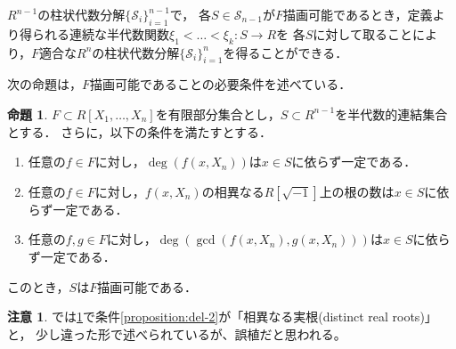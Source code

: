 \documentclass[uplatex, dvipdfmx]{jsarticle}
\numberwithin{equation}{section}
\newcommand{\map}[3]{{#1}\colon{#2}\rightarrow{#3}}
\theoremstyle{definition}
\newtheorem{proposition}[definition]{命題}
\newtheorem{remark}[definition]{注意}
\begin{document}
$R^{n-1}$の柱状代数分解$\{\mathcal{S}_i\}_{i=1}^{n-1}$で，
各$S \in \mathcal{S}_{n-1}$が$F$描画可能であるとき，定義より得られる連続な半代数関数$\map{\xi_1<\dots<\xi_k}{S}{R}$を
各$S$に対して取ることにより，$F$適合な$R^n$の柱状代数分解$\{\mathcal{S}_i\}_{i=1}^n$を得ることができる．

次の命題は，$F$描画可能であることの必要条件を述べている．

\begin{proposition}\label{proposition:del}
     $F \subset R[X_1, \dots, X_n]$を有限部分集合とし，$S \subset R^{n-1}$を半代数的連結集合とする．
     さらに，以下の条件を満たすとする．
     \begin{enumerate}
          \item \label{proposition:del-1}
          任意の$f \in F$に対し，$\deg(f(x, X_n))$は$x \in S$に依らず一定である．
          \item \label{proposition:del-2}
          任意の$f \in F$に対し，$f(x, X_n)$の相異なる$R[\sqrt{-1}]$上の根の数は$x \in S$に依らず一定である．
          \item \label{proposition:del-3}
          任意の$f, g \in F$に対し，$\deg(\gcd(f(x, X_n), g(x, X_n)))$は$x \in S$に依らず一定である．
     \end{enumerate}
     このとき，$S$は$F$描画可能である．
\end{proposition}

\begin{remark}
     \cite[Proposition 5.14]{MR2248869}では\cref{proposition:del}で条件\ref{proposition:del-2}が「相異なる実根(distinct real roots)」と，
     少し違った形で述べられているが、誤植だと思われる。
\end{remark}
\end{document}
